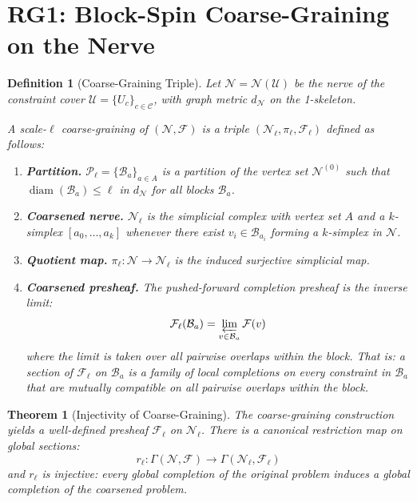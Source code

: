 \documentclass[11pt,letterpaper]{article}
\newtheorem{theorem}[conjecture]{Theorem}
\newtheorem{definition}[conjecture]{Definition}
\newcommand{\sheaf}{\mathcal{F}}
\newcommand{\cover}{\mathcal{U}}
\newcommand{\nerve}{\mathcal{N}}
\newcommand{\constraint}{\mathcal{C}}
\DeclareMathOperator{\diam}{diam}
\newcommand{\block}{\mathcal{B}}
\newcommand{\partition}{\mathcal{P}}
\begin{document}
\section{RG1: Block-Spin Coarse-Graining on the Nerve}

\begin{definition}[Coarse-Graining Triple]\label{def:coarse_grain}
Let $\nerve = \nerve(\cover)$ be the nerve of the constraint cover 
$\cover = \{U_c\}_{c \in \constraint}$, with graph metric $d_\nerve$ 
on the 1-skeleton.

A \emph{scale-$\ell$ coarse-graining} of $(\nerve, \sheaf)$ is a 
triple $(\nerve_\ell, \pi_\ell, \sheaf_\ell)$ defined as follows:

\begin{enumerate}[label=(\roman*)]
    \item \textbf{Partition.} $\partition_\ell = 
    \{\block_a\}_{a \in A}$ is a partition of the vertex set 
    $\nerve^{(0)}$ such that $\diam(\block_a) \leq \ell$ in 
    $d_\nerve$ for all blocks $\block_a$.
    
    \item \textbf{Coarsened nerve.} $\nerve_\ell$ is the simplicial 
    complex with vertex set $A$ and a $k$-simplex 
    $[a_0, \ldots, a_k]$ whenever there exist 
    $v_i \in \block_{a_i}$ forming a $k$-simplex in $\nerve$.
    
    \item \textbf{Quotient map.} $\pi_\ell : \nerve \to \nerve_\ell$ 
    is the induced surjective simplicial map.
    
    \item \textbf{Coarsened presheaf.} The pushed-forward completion 
    presheaf is the inverse limit:
    \begin{equation}\label{eq:coarsened_presheaf}
        \sheaf_\ell(\block_a) = \varprojlim_{v \in \block_a} 
        \sheaf(v)
    \end{equation}
    where the limit is taken over all pairwise overlaps within the 
    block. That is: a section of $\sheaf_\ell$ on $\block_a$ is a 
    family of local completions on every constraint in $\block_a$ 
    that are mutually compatible on all pairwise overlaps within the 
    block.
\end{enumerate}
\end{definition}

\begin{theorem}[Injectivity of Coarse-Graining]\label{thm:rg_inject}
The coarse-graining construction yields a well-defined presheaf 
$\sheaf_\ell$ on $\nerve_\ell$. There is a canonical restriction map 
on global sections:
\begin{equation}\label{eq:rg_restriction}
    r_\ell : \Gamma(\nerve, \sheaf) \longrightarrow 
    \Gamma(\nerve_\ell, \sheaf_\ell)
\end{equation}
and $r_\ell$ is injective: every global completion of the original 
problem induces a global completion of the coarsened problem.
\end{theorem}
\end{document}
